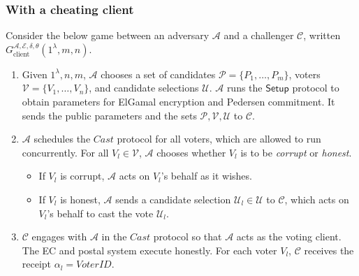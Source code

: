 \documentclass[12pt,a4paper]{article}
\theoremstyle{definition}
\newcommand{\VoterID}{\mathit{VoterID}}
\begin{document}
\subsubsection{With a cheating client}

\begin{definition}
    Consider the below game between an adversary $\mathcal{A}$ and a challenger $\mathcal{C}$, written $G_\text{client}^{\mathcal{A},\mathcal{E},\delta,\theta}(1^\lambda, m, n)$.
    \begin{enumerate}
        \item Given $1^\lambda, n, m$, $\mathcal{A}$ chooses a set of candidates $\mathcal{P}=\{P_1,\ldots,P_m\}$, voters $\mathcal{V}=\{V_1,\ldots,V_n\}$, and candidate selections $\mathcal{U}$. $\mathcal{A}$ runs the $\mathsf{Setup}$ protocol to obtain parameters for ElGamal encryption and Pedersen commitment. It sends the public parameters and the sets $\mathcal{P}, \mathcal{V}, \mathcal{U}$ to $\mathcal{C}$.
        
        \item $\mathcal{A}$ schedules the $\mathit{Cast}$ protocol for all voters, which are allowed to run concurrently. For all $V_l\in\mathcal{V}$, $\mathcal{A}$ chooses whether $V_l$ is to be \textit{corrupt} or \textit{honest}.
        \begin{itemize}
            \item If $V_l$ is corrupt, $\mathcal{A}$ acts on $V_l$'s behalf as it wishes.
            \item If $V_l$ is honest, $\mathcal{A}$ sends a candidate selection $\mathcal{U}_l\in\mathcal{U}$ to $\mathcal{C}$, which acts on $V_l$'s behalf to cast the vote $\mathcal{U}_l$.
        \end{itemize}

        \item $\mathcal{C}$ engages with $\mathcal{A}$ in the $\mathit{Cast}$ protocol so that $\mathcal{A}$ acts as the voting client. The EC and postal system execute honestly. For each voter $V_l$, $\mathcal{C}$ receives the receipt $\alpha_l=\VoterID$.


\end{enumerate}
\end{definition}
\end{document}
